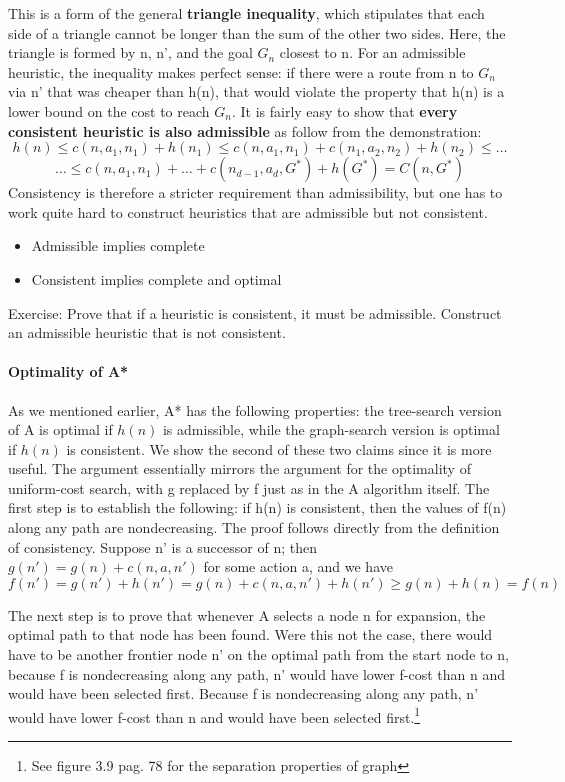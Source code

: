 This is a form of the general \textcolor{CadetBlue!90}{\textbf{triangle inequality}}, which stipulates that each side of a triangle cannot be longer than the sum of the other two sides. Here, the triangle is formed by n, n', and the goal $G_n$ closest to n. For an admissible heuristic, the inequality makes perfect sense:
if there were a route from n to $G_n$ via n' that was cheaper than h(n), that would violate the
property that h(n) is a lower bound on the cost to reach $G_n$.
It is fairly easy to show that \textcolor{CadetBlue!90}{\textbf{every consistent heuristic is also admissible}} as follow from the demonstration:
\[    h(n) \leq c(n, a_{1}, n_{1}) + h(n_{1})\leq  c(n, a_{1}, n_{1}) +  c(n_{1}, a_{2}, n_{2}) + h(n_{2}) \leq \dots\]
\[\dots \leq c(n, a_{1}, n_{1}) + \dots + c(n_{d-1}, a_{d}, G^{*}) + h(G^{*})=C(n,G^{*})\]
Consistency is therefore a stricter requirement than admissibility, but one has to work quite hard to construct heuristics that are admissible but not consistent.
\begin{itemize}
    \item Admissible implies complete
    \item Consistent implies complete and optimal
\end{itemize}
Exercise: Prove that if a heuristic is consistent, it must be admissible. Construct an admissible
heuristic that is not consistent.

\paragraph{Optimality of A*}
As we mentioned earlier, A* has the following properties: the tree-search version of A\text{*} is
optimal if $h(n)$ is admissible, while the graph-search version is optimal if $h(n)$ is consistent.
We show the second of these two claims since it is more useful. The argument essentially mirrors the argument for the optimality of uniform-cost search, with g replaced by f just as in the A\text{*} algorithm itself.
The first step is to establish the following: if h(n) is consistent, then the values of f(n) along any path are nondecreasing. The proof follows directly from the definition of consistency. Suppose n' is a successor of n; then $g(n')=g(n) + c(n, a, n')$ for some action a, and we have 
\begin{equation}
    f(n') = g(n') + h(n') = g(n) + c(n, a, n') + h(n') \geq g(n) + h(n) = f(n)
\end{equation}

The next step is to prove that whenever A\text{*} selects a node n for expansion, the optimal path to that node has been found. Were this not the case, there would have to be another frontier node n' on the optimal path from the start node to n, because f is nondecreasing along any path, n' would have lower f-cost than n and would have been selected first.
Because f is nondecreasing along any path, n' would have lower f-cost than n and would have been selected first.\footnote{See figure 3.9 pag. 78 \cite{RusselNorvig:2009dg} for the separation properties of graph}


